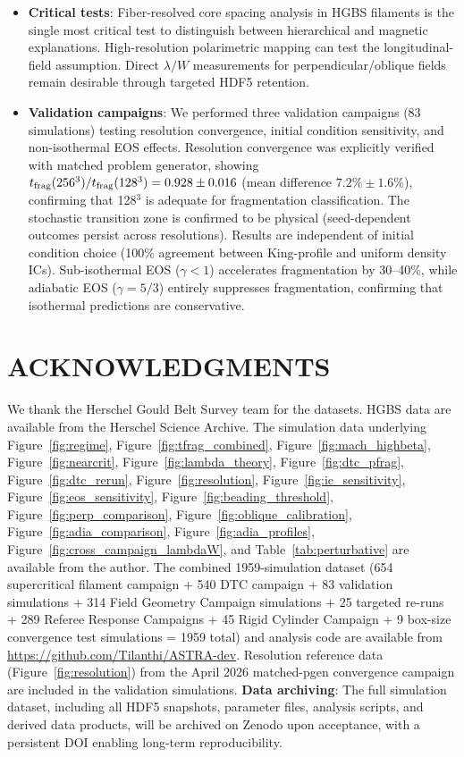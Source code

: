 \documentclass[twoside,twocolumn]{mnras}
\begin{document}
\begin{itemize}
    \item \textbf{Critical tests}: Fiber-resolved core spacing analysis in HGBS filaments is the single most critical test to distinguish between hierarchical and magnetic explanations. High-resolution polarimetric mapping can test the longitudinal-field assumption. Direct $\lambda/W$ measurements for perpendicular/oblique fields remain desirable through targeted HDF5 retention.

    \item \textbf{Validation campaigns}: We performed three validation campaigns (83 simulations) testing resolution convergence, initial condition sensitivity, and non-isothermal EOS effects. Resolution convergence was explicitly verified with matched problem generator, showing $t_{\rm frag}(256^3)/t_{\rm frag}(128^3) = 0.928 \pm 0.016$ (mean difference $7.2\% \pm 1.6\%$), confirming that 128$^3$ is adequate for fragmentation classification. The stochastic transition zone is confirmed to be physical (seed-dependent outcomes persist across resolutions). Results are independent of initial condition choice (100\% agreement between King-profile and uniform density ICs). Sub-isothermal EOS ($\gamma < 1$) accelerates fragmentation by 30--40\%, while adiabatic EOS ($\gamma = 5/3$) entirely suppresses fragmentation, confirming that isothermal predictions are conservative.
\end{itemize}

\section*{ACKNOWLEDGMENTS}

We thank the Herschel Gould Belt Survey team for the datasets. HGBS data are available from the Herschel Science Archive. The simulation data underlying Figure~\ref{fig:regime}, Figure~\ref{fig:tfrag_combined}, Figure~\ref{fig:mach_highbeta}, Figure~\ref{fig:nearcrit}, Figure~\ref{fig:lambda_theory}, Figure~\ref{fig:dtc_pfrag}, Figure~\ref{fig:dtc_rerun}, Figure~\ref{fig:resolution}, Figure~\ref{fig:ic_sensitivity}, Figure~\ref{fig:eos_sensitivity}, Figure~\ref{fig:beading_threshold}, Figure~\ref{fig:perp_comparison}, Figure~\ref{fig:oblique_calibration}, Figure~\ref{fig:adia_comparison}, Figure~\ref{fig:adia_profiles}, Figure~\ref{fig:cross_campaign_lambdaW}, and Table~\ref{tab:perturbative} are available from the author. The combined 1959-simulation dataset (654 supercritical filament campaign + 540 DTC campaign + 83 validation simulations + 314 Field Geometry Campaign simulations + 25 targeted re-runs + 289 Referee Response Campaigns + 45 Rigid Cylinder Campaign + 9 box-size convergence test simulations = 1959 total) and analysis code are available from \url{https://github.com/Tilanthi/ASTRA-dev}. Resolution reference data (Figure~\ref{fig:resolution}) from the April 2026 matched-pgen convergence campaign are included in the validation simulations. \textbf{Data archiving}: The full simulation dataset, including all HDF5 snapshots, parameter files, analysis scripts, and derived data products, will be archived on Zenodo upon acceptance, with a persistent DOI enabling long-term reproducibility.



\end{document}
